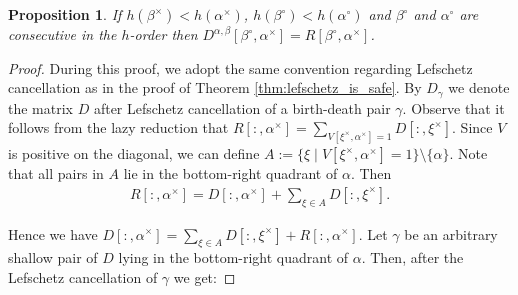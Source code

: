\documentclass[10pt,a4paper]{amsart}
\newtheorem{proposition}{Proposition}
\newcommand{\bda}{\xi}
\newcommand{\bdb}{\gamma}
\newcommand{\bds}{\alpha}
\newcommand{\bdt}{\beta}
\newcommand{\bth}[1]{#1^\circ}
\newcommand{\dth}[1]{#1^{\!\times}}
\newcommand{\mD}{D}
\newcommand{\mR}{R}
\newcommand{\mV}{V}
\newcommand{\mf}{h}
\begin{document}
\begin{proposition}\label{prop:optimization}
    If $\mf(\dth\bdt) < \mf(\dth\bds)$, $\mf(\bth\bdt) < \mf(\bth\bds)$ and $\bth\bdt$ and $\bth\bds$ are consecutive in the $\mf$-order then $\mD^{\bds,\bdt}[\bth\bdt,\dth\bds] = \mR[\bth\bdt,\dth\bds]$.
\end{proposition}

\begin{proof}
   During this proof, we adopt the same convention regarding Lefschetz cancellation as in the proof of Theorem \ref{thm:lefschetz_is_safe}. By $\mD_{\bdb}$ we denote the matrix $\mD$ after Lefschetz cancellation of a birth-death pair $\bdb$. 
   Observe that it follows from the lazy reduction that $\mR[:,\dth\bds] = \sum\limits_{\mV[\dth\bda,\dth\bds] = 1} \mD[:,\dth\bda]$. 
    Since $\mV$ is positive on the diagonal, we can define $A := \{ \bda \mid \mV[\dth\bda,\dth\bds] = 1 \} \setminus \{\bds\}$. 
    Note that all pairs in $A$ lie in the bottom-right quadrant of $\bds$. Then 
    \begin{align*}
        \mR[:,\dth\alpha] = \mD[:,\dth\bds]+\sum\limits_{\bda \in A} \mD[:,\dth\bda].
    \end{align*}

    \noindent Hence we have $\mD[:,\dth\alpha] = \sum\limits_{\bda \in A} \mD[:,\dth\bda] + \mR[:,\dth\bds]$. 
    Let $\bdb$ be an arbitrary shallow pair of $\mD$ lying in the bottom-right quadrant of $\bds$.
    Then, after the Lefschetz cancellation of $\bdb$ we get:


\end{proof}
\end{document}
